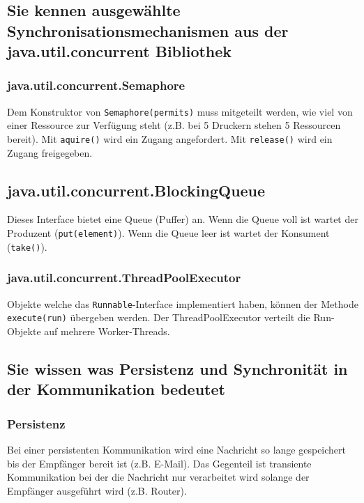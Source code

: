 \subsection{Sie kennen ausgewählte Synchronisationsmechanismen aus der java.util.concurrent Bibliothek}

\subsubsection{java.util.concurrent.Semaphore}

Dem Konstruktor von \texttt{Semaphore(permits)} muss mitgeteilt werden, wie viel von einer Ressource zur Verfügung steht (z.B. bei 5 Druckern stehen 5 Ressourcen bereit). Mit \texttt{aquire()} wird ein Zugang angefordert. Mit \texttt{release()} wird ein Zugang freigegeben.

\subsection{java.util.concurrent.BlockingQueue}

Dieses Interface bietet eine Queue (Puffer) an. Wenn die Queue voll ist wartet der Produzent (\texttt{put(element)}). Wenn die Queue leer ist wartet der Konsument (\texttt{take()}).

\subsubsection{java.util.concurrent.ThreadPoolExecutor}

Objekte welche das \texttt{Runnable}-Interface implementiert haben, können der Methode \texttt{execute(run)} übergeben werden. Der ThreadPoolExecutor verteilt die Run-Objekte auf mehrere Worker-Threads. 

\subsection{Sie wissen was Persistenz und Synchronität in der Kommunikation bedeutet}

\subsubsection{Persistenz}

Bei einer persistenten Kommunikation wird eine Nachricht so lange gespeichert bis der Empfänger bereit ist (z.B. E-Mail). Das Gegenteil ist transiente Kommunikation bei der die Nachricht nur verarbeitet wird solange der Empfänger ausgeführt wird (z.B. Router). 

